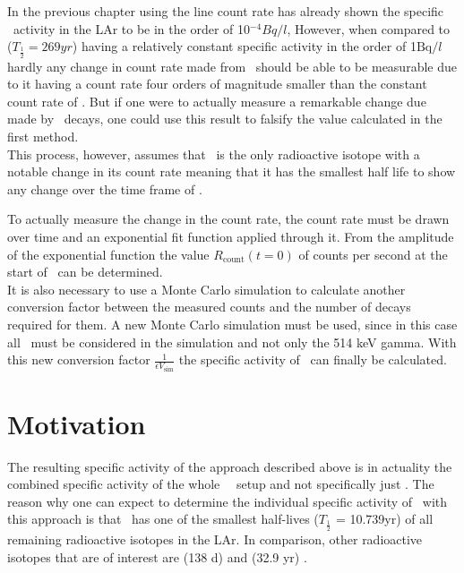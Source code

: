 In the previous chapter using the line count rate has already shown the specific \Kr\ activity in the LAr to be in the order of 10$^{-4} \unit{Bq}/\unit{l}$,
However, when compared to  ($T_{\frac{1}{2}} = 269\unit{yr}$) \cite{singh_nuclear_2006} having a relatively constant specific activity in the order of 1$\mathrm{Bq}/\unit{l}$ hardly any change in count rate made from \Kr\ should be able to be measurable due to it having a count rate four orders of magnitude smaller than the constant count rate of .
But if one were to actually measure a remarkable change due made by \Kr\ decays, one could use this result to falsify the value calculated in the first method.
\\

This process, however, assumes that \Kr\ is the only radioactive isotope with a notable change in its count rate meaning that it has the smallest half life to show any change over the time frame of \PII.




To actually measure the change in the count rate, the count rate must be drawn over time and an exponential fit function applied through it.
From the amplitude of the exponential function the value $R_{\mathrm{count}}(t=0)$ of counts per second at the start of \PII\ can be determined.
\\

It is also necessary to use a Monte Carlo simulation to calculate another conversion factor between the measured counts and the number of decays required for them. 
A new Monte Carlo simulation must be used, since in this case all \Kr\ must be considered in the simulation and not only the 514 keV gamma.
With this new conversion factor $\frac{1}{\epsilon V_{\mathrm{sim}}}$ the specific activity of \Kr\ can finally be calculated.

\section{Motivation}
\label{sec:motivation}
The resulting specific activity of the approach described above is in actuality the combined specific activity of the whole \gerda\ \PII\ setup and not specifically just \Kr.
The reason why one can expect to determine the individual specific activity of \Kr\ with this approach is that \Kr\ has one of the smallest half-lives ($T_{\frac{1}{2}}$ = 10.739\unit{yr}) of all remaining radioactive isotopes in the LAr. 
In comparison, other radioactive isotopes that are of interest are  (138 d)\cite{kondev_nuclear_2008} and  (32.9 yr) \cite{chen_nuclear_2016} .
\\

